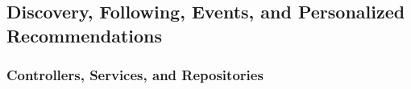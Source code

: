 \subsection{Discovery, Following, Events, and Personalized Recommendations}

\subsubsection*{Controllers, Services, and Repositories}

